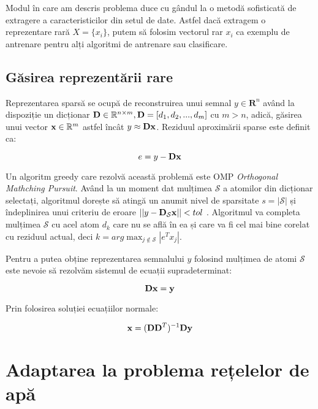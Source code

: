 Modul în care am descris problema duce cu gândul la o metodă sofisticată de extragere a caracteristicilor din setul de date. Astfel dacă extragem o reprezentare rară $X = \{x_i\}$, putem să folosim vectorul rar $x_i$ ca exemplu de antrenare pentru alți algoritmi de antrenare sau clasificare.


\subsection{Găsirea reprezentării rare}
Reprezentarea sparsă se ocupă de reconstruirea unui semnal $y \in \mathbf{R}^n$ având la dispoziție un dicționar $\mathbf{D} \in \mathbb{R}^{n\times m}, \mathbf{D} = [d_1, d_2, ..., d_m]$ cu $m > n$, adică, găsirea unui vector $\mathbf{x} \in \mathbb{R}^m$ astfel încât $y \approx \mathbf{D} \mathbf{x}$. 
Reziduul aproximării sparse este definit ca:

\begin{equation}
    e = y - \mathbf{D} \mathbf{x}
\end{equation}

Un algoritm greedy care rezolvă această problemă este OMP \textit{Orthogonal Mathching Pursuit}. Având la un moment dat mulțimea $\mathcal{S}$ a atomilor din dicționar selectați, algoritmul dorește să atingă un anumit nivel de sparsitate $s = |\mathcal{S}|$ și îndeplinirea unui criteriu de eroare $||y - \mathbf{D_{\mathcal{S}}} \mathbf{x}|| < tol$ \cite[Capitolul 1]{DL_book}. Algoritmul va completa mulțimea $\mathcal{S}$  cu acel atom $d_k$ care nu se află în ea și care va fi cel mai bine corelat cu reziduul actual, deci $k = arg \max_{j \not \in \mathcal{S}} |e^T x_j|$. 

Pentru a putea obține reprezentarea semnalului $y$ folosind mulțimea de atomi $\mathcal{S}$ este nevoie să rezolvăm sistemul de ecuații supradeterminat:

\begin{equation}
    \mathbf{D} \mathbf{x} = \mathbf{y}
\end{equation}

Prin folosirea soluției ecuațiilor normale:

\begin{equation}
    \mathbf{x} = (\mathbf{D} \mathbf{D}^T)^{-1} \mathbf{D} \mathbf{y}
\end{equation}


\section{Adaptarea la problema rețelelor de apă}

